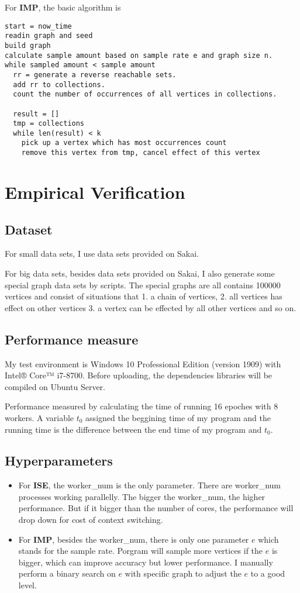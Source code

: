 \documentclass[lang=en,12pt]{elegantpaper}
\begin{document}
For \textbf{IMP}, the basic algorithm is
\begin{lstlisting}
start = now_time
readin graph and seed
build graph
calculate sample amount based on sample rate e and graph size n.
while sampled amount < sample amount
  rr = generate a reverse reachable sets.
  add rr to collections.
  count the number of occurrences of all vertices in collections.

  result = []
  tmp = collections
  while len(result) < k
    pick up a vertex which has most occurrences count
    remove this vertex from tmp, cancel effect of this vertex
\end{lstlisting}

\section{Empirical Verification}
\subsection{Dataset}
For small data sets, I use data sets provided on Sakai.

For big data sets, besides data sets provided on Sakai, I also generate some special graph data sets by scripts.
The special graphs are all contains 100000 vertices and consist of situations that 1. a chain of vertices, 2. all vertices has effect on other vertices 3. a vertex can be effected by all other vertices and so on.
\subsection{Performance measure}
My test environment is Windows 10 Professional Edition (version 1909) with Intel® Core™ i7-8700. Before uploading, the dependencies libraries will be compiled on Ubuntu Server.

Performance measured by calculating the time of running 16 epoches with 8 workers. A variable $t_0$ assigned the beggining time of my program and the running time is the difference between the end time of my program and $t_0$.

\subsection{Hyperparameters}
\begin{itemize}
  \item For \textbf{ISE}, the worker\_num is the only parameter. There are worker\_num processes working parallelly.
  The bigger the worker\_num, the higher performance. But if it bigger than the number of cores, the performance will drop down for cost of context switching.
  \item For \textbf{IMP}, besides the worker\_num, there is only one parameter $e$ which stands for the sample rate.
  Porgram will sample more vertices if the $e$ is bigger, which can improve accuracy but lower performance.
  I manually perform a binary search on $e$ with specific graph to adjust the $e$ to a good level.
\end{itemize}
\end{document}
